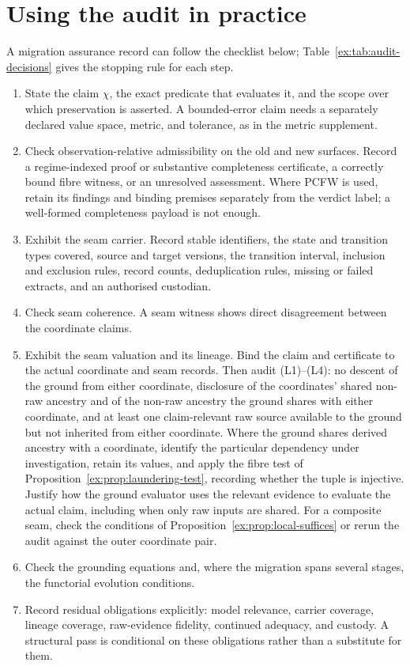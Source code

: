 \documentclass[smallextended,envcountsect,envcountsame,natbib]{svjour3}
\begin{document}
\section{Using the audit in practice}\label{ex:sec:practice}
A migration assurance record can follow the checklist below; Table~\ref{ex:tab:audit-decisions} gives the stopping rule for each step.
\begin{enumerate}
\item State the claim $\chi$, the exact predicate that evaluates it, and the scope over which preservation is asserted. A bounded-error claim needs a separately declared value space, metric, and tolerance, as in the metric supplement.
\item Check observation-relative admissibility on the old and new surfaces. Record a regime-indexed proof or substantive completeness certificate, a correctly bound fibre witness, or an unresolved assessment. Where PCFW is used, retain its findings and binding premises separately from the verdict label; a well-formed completeness payload is not enough.
\item Exhibit the seam carrier. Record stable identifiers, the state and transition types covered, source and target versions, the transition interval, inclusion and exclusion rules, record counts, deduplication rules, missing or failed extracts, and an authorised custodian.
\item Check seam coherence. A seam witness shows direct disagreement between the coordinate claims.
\item Exhibit the seam valuation and its lineage. Bind the claim and certificate to the actual coordinate and seam records. Then audit (L1)--(L4): no descent of the ground from either coordinate, disclosure of the coordinates' shared non-raw ancestry and of the non-raw ancestry the ground shares with either coordinate, and at least one claim-relevant raw source available to the ground but not inherited from either coordinate. Where the ground shares derived ancestry with a coordinate, identify the particular dependency under investigation, retain its values, and apply the fibre test of Proposition~\ref{ex:prop:laundering-test}, recording whether the tuple is injective. Justify how the ground evaluator uses the relevant evidence to evaluate the actual claim, including when only raw inputs are shared. For a composite seam, check the conditions of Proposition~\ref{ex:prop:local-suffices} or rerun the audit against the outer coordinate pair.
\item Check the grounding equations and, where the migration spans several stages, the functorial evolution conditions.
\item Record residual obligations explicitly: model relevance, carrier coverage, lineage coverage, raw-evidence fidelity, continued adequacy, and custody. A structural pass is conditional on these obligations rather than a substitute for them.
\end{enumerate}
\end{document}
